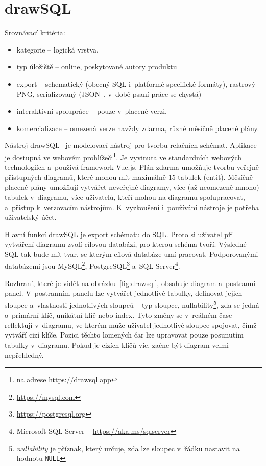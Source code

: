 \section{drawSQL}

Srovnávací kritéria:
\begin{itemize}
  \item kategorie -- logická vrstva,
  \item typ úložiště -- online, poskytované autory produktu
  \item export -- schematický (obecný SQL i~platformě specifické formáty), rastrový PNG, serializovaný (JSON~\cite{json2017}, v~době psaní práce se chystá)
  \item interaktivní spolupráce -- pouze v~placené verzi,
  \item komercializace -- omezená verze navždy zdarma, různé měsíčně placené plány.
\end{itemize}

Nástroj drawSQL~\cite{drawsql21} je modelovací nástroj pro tvorbu relačních schémat.
Aplikace je dostupná ve webovém prohlížeči\footnote{na adrese \url{https://drawsql.app}}.
Je vyvinuta ve standardních webových technologiích a~používá framework Vue.js.
Plán zdarma umožňuje tvorbu veřejně přístupných diagramů, které mohou mít maximálně 15 tabulek (entit).
Měsíčně placené plány umožňují vytvářet neveřejné diagramy, více (až neomezeně mnoho) tabulek v~diagramu, více uživatelů, kteří mohou na diagramu spolupracovat, a~přístup k~verzovacím nástrojům.
K~vyzkoušení i~používání nástroje je potřeba uživatelský účet.

Hlavní funkcí drawSQL je export schématu do SQL.
Proto si uživatel při vytváření diagramu zvolí cílovou databázi, pro kterou schéma tvoří.
Výsledné SQL tak bude mít tvar, se kterým cílová databáze umí pracovat.
Podporovanými databázemi jsou
MySQL\footnote{\url{https://mysql.com}},
PostgreSQL\footnote{\url{https://postgresql.org}}
a~SQL Server\footnote{Microsoft SQL Server -- \url{https://aka.ms/sqlserver}}.

Rozhraní, které je vidět na obrázku~\ref{fig:drawsql}, obsahuje diagram a~postranní panel.
V~postranním panelu lze vytvářet jednotlivé tabulky, definovat jejich sloupce a~vlastnosti jednotlivých sloupců -- typ sloupce,
nullability\footnote{\emph{nullability} je příznak, který určuje, zda lze sloupec v~řádku nastavit na hodnotu \texttt{NULL}},
zda se jedná o~primární klíč, unikátní klíč nebo index.
Tyto změny se v~reálném čase reflektují v~diagramu, ve kterém může uživatel jednotlivé sloupce spojovat, čímž vytváří cizí klíče.
Pozici těchto lomených čar lze upravovat pouze posunutím tabulky v~diagramu.
Pokud je cizích klíčů víc, začne být diagram velmi nepřehledný.

